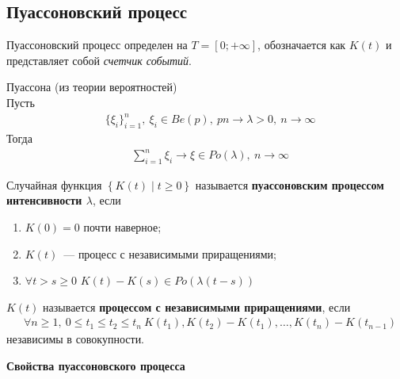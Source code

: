 \subsection{Пуассоновский процесс}
Пуассоновский процесс определен на $T = [0; +\infty]$, обозначается как $K(t)$ и
представляет собой \textit{счетчик событий}.
\begin{theorem} Пуассона (из теории вероятностей)
    \\
    Пусть
    \begin{align*}
      & \{\xi_i\}_{i=1}^n, \ \xi_i \in Be(p), \ pn \to \lambda > 0, \ n \to \infty
    \end{align*}
    Тогда
    \begin{align*}
      & \sum_{i=1}^n\xi_i \to \xi \in Po(\lambda), \ n \to \infty
    \end{align*}    
\end{theorem}
\begin{Def}
    Случайная функция $\left\{ K(t) \mid t \geq 0 \right\}$ называется
    \textbf{пуассоновским процессом интенсивности $\lambda$}, если
    \begin{enumerate}
        \item $K(0) = 0$ почти наверное;
        \item $K(t)$~--- процесс с независимыми приращениями;
        \item $\forall t > s \geq 0$ $K(t) - K(s) \in Po(\lambda(t-s))$
    \end{enumerate}
\end{Def}
\begin{Def}
    $K(t)$ называется \textbf{процессом с независимыми приращениями}, если
    \begin{align*}
      & \forall n \geq 1, \ 0 \leq t_1 \leq t_2 \leq t_n \ K(t_1), K(t_2) - K(t_1), \dots, K(t_n) - K(t_{n-1})
    \end{align*}
    независимы в совокупности.
\end{Def}
\textbf{Свойства пуассоновского процесса}
